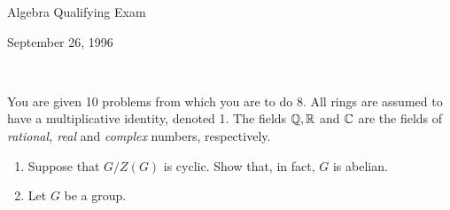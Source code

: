 \documentclass{article}
\begin{document}
\begin{Large}

\begin{center}\begin{LARGE}
{\Bbb Algebra Qualifying Exam}\\

\end{LARGE}
{\Bbb September 26, 1996}
\end{center}
\vspace{0.1in}
\noindent\hrulefill\

 You are given 10 problems from which you
are to do 8.
 All rings are assumed to have a multiplicative
identity, denoted 1. The fields ${\Bbb Q}, {\Bbb R}$ and ${\Bbb C}$ are the
fields of {\em rational, real} and {\em complex} numbers, respectively.

\vspace{0.2in}
\begin{enumerate}


\item Suppose that $G/Z(G)$ is cyclic. Show that, in fact, $G$ is abelian.


\item Let $G$ be a group.



\end{enumerate}
\end{Large}
\end{document}
